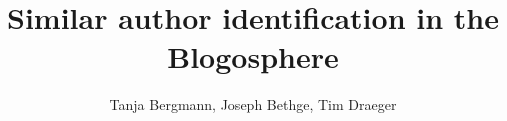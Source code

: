 \documentclass{llncs}
\title{Similar author identification in the Blogosphere}
\author{Tanja Bergmann, Joseph Bethge, Tim Draeger}
\institute{Hasso Plattner Institute, Potsdam, Germany}
\begin{document}
\maketitle

\begin{abstract}

\end{abstract}













\newpage


\end{document}
